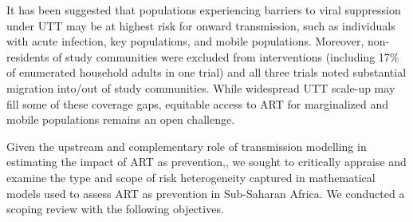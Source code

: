 It has been suggested that populations experiencing barriers to viral suppression under UTT		%
may be at highest risk for onward transmission, such as 
individuals with acute infection, key populations, and mobile populations.\cite{Tanser2015,Hakim2018,Nyato2019}  %
Moreover, non-residents of study communities were excluded from interventions
(including 17\% of enumerated household adults in one trial\cite{Havlir2019})
and all three trials noted substantial migration into/out of study communities.		%
\cite{Iwuji2018,Havlir2019,Hayes2019}
While widespread UTT scale-up may fill some of these coverage gaps,
equitable access to ART for marginalized and mobile populations remains an open challenge.	%
\cite{Tanser2015,deGruchy2020}
\par
Given the upstream and complementary role of transmission modelling
in estimating the impact of ART as prevention,\cite{Eaton2012,Delva2012},	%
we sought to critically appraise and examine the type and scope of risk heterogeneity captured
in mathematical models used to assess ART as prevention in Sub-Saharan Africa.
We conducted a scoping review with the following objectives.
